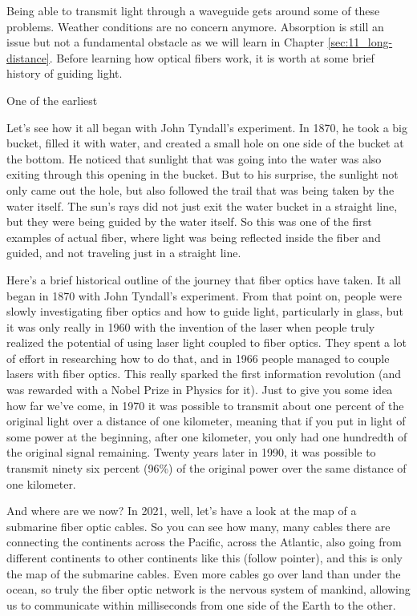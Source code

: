 Being able to transmit light through a waveguide gets around some of these problems.
Weather conditions are no concern anymore.
Absorption is still an issue but not a fundamental obstacle as we will learn in Chapter \ref{sec:11_long-distance}.
Before learning how optical fibers work, it is worth at some brief history of guiding light.

One of the earliest 

Let's see how it all began with John Tyndall's experiment. In 1870, he took a big bucket, filled it with water, and created a small hole on one side of the bucket at the bottom. He noticed that sunlight that was going into the water was also exiting through this opening in the bucket. But to his surprise, the sunlight not only came out the hole, but also followed the trail that was being taken by the water itself. The sun's rays did not just exit the water bucket in a straight line, but they were being guided by the water itself. So this was one of the first examples of actual fiber, where light was being reflected inside the fiber and guided, and not traveling just in a straight line.

Here's a brief historical outline of the journey that fiber optics have taken. It all began in 1870 with John Tyndall's experiment. From that point on, people were slowly investigating fiber optics and how to guide light, particularly in glass, but it was only really in 1960 with the invention of the laser when people truly realized the potential of using laser light coupled to fiber optics. They spent a lot of effort in researching how to do that, and in 1966 people managed to couple lasers with fiber optics. This really sparked the first information revolution (and was rewarded with a Nobel Prize in Physics for it). Just to give you some idea how far we've come, in 1970 it was possible to transmit about one percent of the original light over a distance of one kilometer, meaning that if you put in light of some power at the beginning, after one kilometer, you only had one hundredth of the original signal remaining. Twenty years later in 1990, it was possible to transmit ninety six percent (96\%) of the original power over the same distance of one kilometer.

And where are we now? In 2021, well, let's have a look at the map of a submarine fiber optic cables. So you can see how many, many cables there are connecting the continents across the Pacific, across the Atlantic, also going from different continents to other continents like this (follow pointer), and this is only the map of the submarine cables. Even more cables go over land than under the ocean, so truly the fiber optic network is the nervous system of mankind, allowing us to communicate within milliseconds from one side of the Earth to the other.

